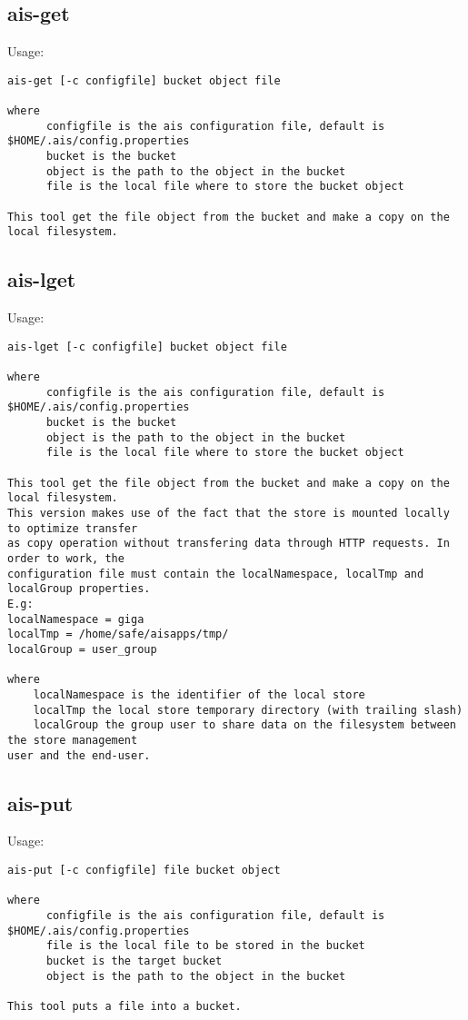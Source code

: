 \documentclass[11pt]{article}
\begin{document}
\subsection{ais-get}
Usage:\\
\begin{verbatim}
ais-get [-c configfile] bucket object file

where 
      configfile is the ais configuration file, default is $HOME/.ais/config.properties
      bucket is the bucket
      object is the path to the object in the bucket
      file is the local file where to store the bucket object
      
This tool get the file object from the bucket and make a copy on the local filesystem.
\end{verbatim}
\subsection{ais-lget}
Usage:\\
\begin{verbatim}
ais-lget [-c configfile] bucket object file

where 
      configfile is the ais configuration file, default is $HOME/.ais/config.properties
      bucket is the bucket
      object is the path to the object in the bucket
      file is the local file where to store the bucket object
      
This tool get the file object from the bucket and make a copy on the local filesystem.
This version makes use of the fact that the store is mounted locally to optimize transfer
as copy operation without transfering data through HTTP requests. In order to work, the
configuration file must contain the localNamespace, localTmp and localGroup properties.
E.g:
localNamespace = giga
localTmp = /home/safe/aisapps/tmp/
localGroup = user_group

where
    localNamespace is the identifier of the local store
    localTmp the local store temporary directory (with trailing slash)
    localGroup the group user to share data on the filesystem between the store management
user and the end-user.

\end{verbatim}

\subsection{ais-put}
Usage:\\
\begin{verbatim}
ais-put [-c configfile] file bucket object

where 
      configfile is the ais configuration file, default is $HOME/.ais/config.properties
      file is the local file to be stored in the bucket
      bucket is the target bucket
      object is the path to the object in the bucket
      
This tool puts a file into a bucket.
\end{verbatim}
\end{document}
